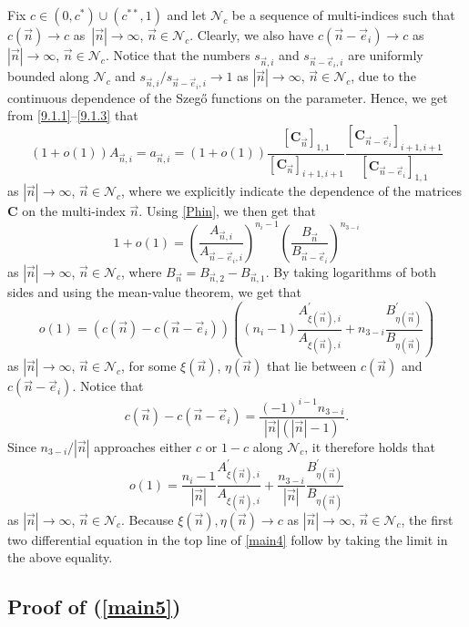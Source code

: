 \documentclass[pdftex]{sigma}
\numberwithin{equation}{section}
\newcommand{\n}{{\vec n}}
\begin{document}
Fix $ c \in (0,c^*) \cup (c^{**},1) $ and let $ \mathcal N_c $ be a sequence of multi-indices such that $ c(\n) \to c $ as~$ {|\n| \to\infty }$, $ \n\in \mathcal N_c $. Clearly, we also have $ c(\n-\vec e_i) \to c $ as $ |\n| \to\infty $, $ \n\in \mathcal N_c $. Notice that the numbers $ s_{\n,i} $ and $ s_{\n-\vec e_i,i} $ are uniformly bounded along $ \mathcal N_c $ and $ s_{\n,i}/s_{\n-\vec e_i,i}\to 1 $ as $ |\n| \to\infty $, $ \n\in \mathcal N_c $, due to the continuous dependence of the Szeg\H{o} functions on the parameter. Hence, we get from \eqref{9.1.1}--\eqref{9.1.3} that
\[
(1+o(1))A_{\n,i} = a_{\n,i} = (1+o(1))\frac{[\boldsymbol C_\n]_{1,1}}{[\boldsymbol C_\n]_{i+1,i+1}}\frac{[\boldsymbol C_{\n-\vec e_i}]_{i+1,i+1}}{[\boldsymbol C_{\n-\vec e_i}]_{1,1}}
\]
as $ |\n| \to\infty $, $ \n\in \mathcal N_c $, where we explicitly indicate the dependence of the matrices $ \boldsymbol C $ on the multi-index $ \n $. Using \eqref{Phin}, we then get that
\[
1+o(1) = \left( \frac{A_{\n,i}}{A_{\n-\vec e_i,i}} \right)^{n_i-1} \left( \frac{B_\n}{B_{\n-\vec e_i}} \right)^{n_{3-i}}
\]
as $ |\n| \to\infty $, $ \n\in \mathcal N_c $, where $ B_\n = B_{\n,2} - B_{\n,1} $. By taking logarithms of both sides and using the mean-value theorem, we get that
\[
o(1) = (c(\n) - c(\n-\vec e_i)) \left((n_i-1) \frac{A_{\xi(\n),i}^\prime}{A_{\xi(\n),i}} + n_{3-i} \frac{B_{\eta(\n)}^\prime}{B_{\eta(\n)}} \right)
\]
as $ |\n| \to\infty $, $ \n\in \mathcal N_c $, for some $ \xi(\n)$, $\eta(\n) $ that lie between $ c(\n) $ and $ c(\n-\vec e_i) $. Notice that
\[
c(\n) - c(\n-\vec e_i) = \frac{(-1)^{i-1} n_{3-i}}{|\n|(|\n|-1)}.
\]
Since $ n_{3-i}/|\n| $ approaches either $ c $ or $ 1-c $ along $ \mathcal N_c $, it therefore holds that
\[
o(1) = \frac{n_i-1}{|\n|}\frac{A_{\xi(\n),i}^\prime}{A_{\xi(\n),i}} + \frac{n_{3-i}}{|\n|} \frac{B_{\eta(\n)}^\prime}{B_{\eta(\n)}}
\]
as $ |\n| \to\infty $, $ \n\in \mathcal N_c $. Because $ \xi(\n),\eta(\n) \to c $ as $ |\n| \to\infty $, $ \n\in \mathcal N_c $, the first two differential equation in the top line of \eqref{main4} follow by taking the limit in the above equality.

\subsection[Proof of (1.35)]{Proof of (\ref{main5})}
\end{document}
